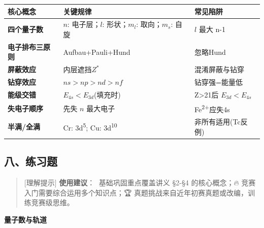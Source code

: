 {\def\LTcaptype{none} %
\begin{longtable}[]{@{}
  >{\raggedright\arraybackslash}p{}
  >{\raggedright\arraybackslash}p{}
  >{\raggedright\arraybackslash}p{}@{}}
\toprule\noalign{}
\begin{minipage}[b]{\linewidth}\raggedright
核心概念
\end{minipage} & \begin{minipage}[b]{\linewidth}\raggedright
关键规律
\end{minipage} & \begin{minipage}[b]{\linewidth}\raggedright
常见陷阱
\end{minipage} \\
\midrule\noalign{}
\endhead
\bottomrule\noalign{}
\endlastfoot
\textbf{四个量子数} & \(n\): 电子层；\(l\): 形状；\(m_l\): 取向；\(m_s\): 自旋 & \(l\) 最大 n-1 \\
\textbf{电子排布三原则} & Aufbau+Pauli+Hund & 忽略Hund \\
\textbf{屏蔽效应} & 内层遮挡\箭\(Z^*\) & 混淆屏蔽与钻穿 \\
\textbf{钻穿效应} & \(ns>np>nd>nf\) & 钻穿强=能量低 \\
\textbf{能级交错} & \(E_{4s}<E_{3d}\)(填充时) & Z\textgreater21后 \(E_{3d}<E_{4s}\) \\
\textbf{失电子顺序} & 先失 \(n\) 最大电子 & Fe\textsuperscript{2+}应失4s \\
\textbf{半满/全满} & Cr: 3d\textsuperscript{5}; Cu: 3d\textsuperscript{10} & 非所有适用(Tc反例) \\
\end{longtable}
}

\subsection{八、练习题}\label{ux516bux7ec3ux4e60ux9898}

\begin{quote}
{[}理解提示{]} \textbf{使用建议}：🌱 基础巩固重点覆盖讲义 §2-§4 的核心概念；🔥 竞赛入门需要综合运用多个知识点；🏆 真题挑战来自近年初赛真题或改编，训练竞赛级思维。
\end{quote}

\textbf{量子数与轨道}

